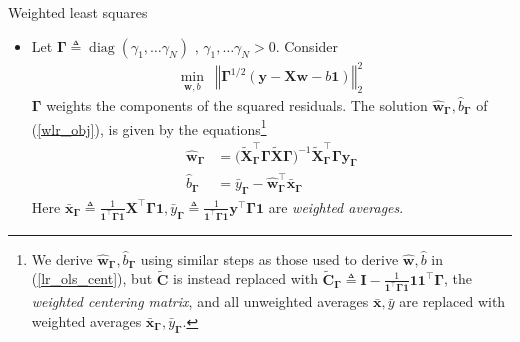 \documentclass{beamer}
\numberwithin{equation}{section}
\newcommand{\aref}[1]{\alert{\ref{#1}}}
\begin{document}
\begin{frame}{Weighted least squares}
    \begin{itemize}
        \item
        Let $ \mathbf{\Gamma} \triangleq \operatorname{diag}(\gamma_1, \ldots
        \gamma_N)$ , $ \gamma_1, \ldots \gamma_N > 0 $. Consider
        \begin{equation} \label{wlr_obj}
            \begin{array}{ll}
                \displaystyle\min_{\mathbf{w}, b} &
                \left\Vert\mathbf{\Gamma}^{1 / 2}(\mathbf{y} - \mathbf{Xw} - 
                b\mathbf{1})\right\Vert_2^2
            \end{array}
        \end{equation}
        $ \mathbf{\Gamma} $ weights the components of the squared residuals.
        The solution $ \hat{\mathbf{w}}_\mathbf{\Gamma},
        \hat{b}_\mathbf{\Gamma} $ of (\aref{wlr_obj}), is given by the
        equations\footnote{
            We derive $ \hat{\mathbf{w}}_\mathbf{\Gamma},
            \hat{b}_\mathbf{\Gamma} $ using similar steps as those used to
            derive $ \hat{\mathbf{w}}, \hat{b} $ in (\aref{lr_ols_cent}), but
            $ \tilde{\mathbf{C}} $ is instead replaced with
            $ \tilde{\mathbf{C}}_\mathbf{\Gamma} \triangleq \mathbf{I} -
            \frac{1}{\mathbf{1}^\top\mathbf{\Gamma 1}}
            \mathbf{11}^\top\mathbf{\Gamma} $, the \textit{weighted
            centering matrix}, and all unweighted averages $ \bar{\mathbf{x}},
            \bar{y} $ are replaced with weighted averages
            $ \bar{\mathbf{x}}_\mathbf{\Gamma}, \bar{y}_\mathbf{\Gamma} $.
        }
        \begin{equation} \label{wlr_sol}
            \begin{split}
                \hat{\mathbf{w}}_\mathbf{\Gamma} & = \big(
                    \tilde{\mathbf{X}}_\mathbf{\Gamma}^\top
                    \mathbf{\Gamma}\tilde{\mathbf{X}}\mathbf{\Gamma}
                \big)^{-1}\tilde{\mathbf{X}}_\mathbf{\Gamma}^\top
                \mathbf{\Gamma}\mathbf{y}_\mathbf{\Gamma} \\
                \hat{b}_\mathbf{\Gamma} & = \bar{y}_\mathbf{\Gamma} -
                \hat{\mathbf{w}}_\mathbf{\Gamma}^\top
                \bar{\mathbf{x}}_\mathbf{\Gamma}
            \end{split}
        \end{equation}
        Here $ \bar{\mathbf{x}}_\mathbf{\Gamma} \triangleq
        \frac{1}{\mathbf{1}^\top\mathbf{\Gamma 1}}\mathbf{X}^\top
        \mathbf{\Gamma 1}, \bar{y}_\mathbf{\Gamma} \triangleq
        \frac{1}{\mathbf{1}^\top\mathbf{\Gamma 1}}\mathbf{y}^\top
        \mathbf{\Gamma 1} $ are \textit{weighted averages}.
    \end{itemize}
\end{frame}
\end{document}

